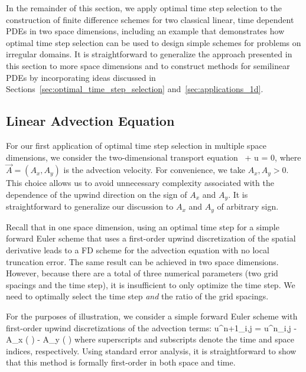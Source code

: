\documentclass[oneeqnum,onefignum,onetabnum,onethmnum]{siamltex}
\begin{document}
In the remainder of this section, we apply optimal time step selection 
to the construction of finite difference schemes for two classical linear,
time dependent PDEs in two space dimensions, including an example that
demonstrates how optimal time step selection can be used to design simple
schemes for problems on irregular domains.  It is straightforward to 
generalize the approach presented in this section to more space dimensions 
and to construct methods for semilinear PDEs by incorporating ideas discussed 
in Sections~\ref{sec:optimal_time_step_selection} 
and~\ref{sec:applications_1d}.  


\subsection{Linear Advection Equation}
For our first application of optimal time step selection in multiple
space dimensions, we consider the two-dimensional transport 
equation~\cite{evans_book}
\beq
   +  \cdot \nabla u = 0,
  \label{eq:advection_eqn_2d}
\eeq
where $\vec{A} = (A_x, A_y)$ is the advection velocity.  For convenience, we 
take $A_x, A_y > 0$.  This choice allows us to avoid unnecessary complexity 
associated with the dependence of the upwind direction on the sign of $A_x$ 
and $A_y$.  It is straightforward to generalize our discussion to $A_x$ and 
$A_y$ of arbitrary sign.

Recall that in one space dimension, using an optimal time step for
a simple forward Euler scheme that uses a first-order upwind discretization
of the spatial derivative leads to a FD scheme for the advection equation
with no local truncation error.  The same result can be achieved in 
two space dimensions.  However, because there are a total of three
numerical parameters (\ie two grid spacings and the time step), it is 
insufficient to only optimize the time step.  We need to optimally select
the time step \emph{and} the ratio of the grid spacings. 

For the purposes of illustration, we consider a simple forward Euler scheme 
with first-order upwind discretizations of the advection terms:
\beq
  u^{n+1}_{i,j} = u^{n}_{i,j}
  - A_x \dt \left(  \right)
  - A_y \dt \left(  \right)
  \label{eq:advection_eqn_2d_FD_scheme}
\eeq
where superscripts and subscripts denote the time and space indices, 
respectively.  Using standard error analysis, it is straightforward to show
that this method is formally first-order in both space and time.  
\end{document}
